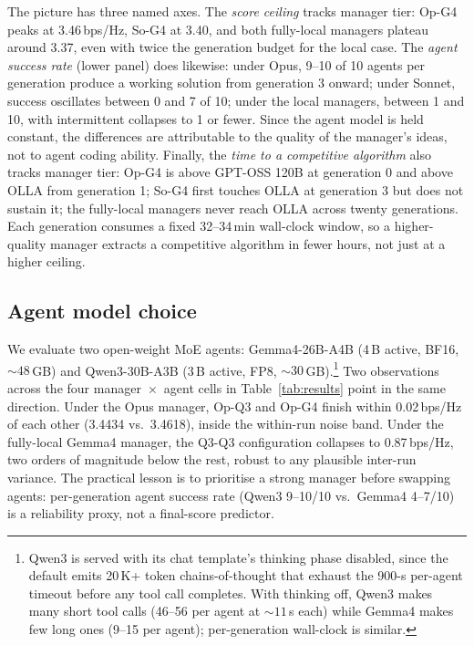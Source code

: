 \documentclass[journal]{IEEEtran}
\begin{document}
The picture has three named axes. The \emph{score ceiling} tracks manager tier: Op-G4 peaks at 3.46\,bps/Hz, So-G4 at 3.40, and both fully-local managers plateau around 3.37, even with twice the generation budget for the local case. The \emph{agent success rate} (lower panel) does likewise: under Opus, 9--10 of 10 agents per generation produce a working solution from generation 3 onward; under Sonnet, success oscillates between 0 and 7 of 10; under the local managers, between 1 and 10, with intermittent collapses to 1 or fewer. Since the agent model is held constant, the differences are attributable to the quality of the manager's ideas, not to agent coding ability. Finally, the \emph{time to a competitive algorithm} also tracks manager tier: Op-G4 is above GPT-OSS 120B at generation 0 and above OLLA from generation 1; So-G4 first touches OLLA at generation 3 but does not sustain it; the fully-local managers never reach OLLA across twenty generations. Each generation consumes a fixed 32--34\,min wall-clock window, so a higher-quality manager extracts a competitive algorithm in fewer hours, not just at a higher ceiling.

\subsection{Agent model choice}
\label{sec:agentmodel}

We evaluate two open-weight MoE agents: Gemma4-26B-A4B (4\,B active, BF16, ${\sim}48$\,GB) and Qwen3-30B-A3B (3\,B active, FP8, ${\sim}30$\,GB).\footnote{Qwen3 is served with its chat template's thinking phase disabled, since the default emits 20\,K+ token chains-of-thought that exhaust the 900-s per-agent timeout before any tool call completes. With thinking off, Qwen3 makes many short tool calls (46--56 per agent at ${\sim}11$\,s each) while Gemma4 makes few long ones (9--15 per agent); per-generation wall-clock is similar.} Two observations across the four manager~$\times$~agent cells in Table~\ref{tab:results} point in the same direction. Under the Opus manager, Op-Q3 and Op-G4 finish within 0.02\,bps/Hz of each other (3.4434 vs.\ 3.4618), inside the within-run noise band. Under the fully-local Gemma4 manager, the Q3-Q3 configuration collapses to 0.87\,bps/Hz, two orders of magnitude below the rest, robust to any plausible inter-run variance. The practical lesson is to prioritise a strong manager before swapping agents: per-generation agent success rate (Qwen3 9--10/10 vs.\ Gemma4 4--7/10) is a reliability proxy, not a final-score predictor.
\end{document}
